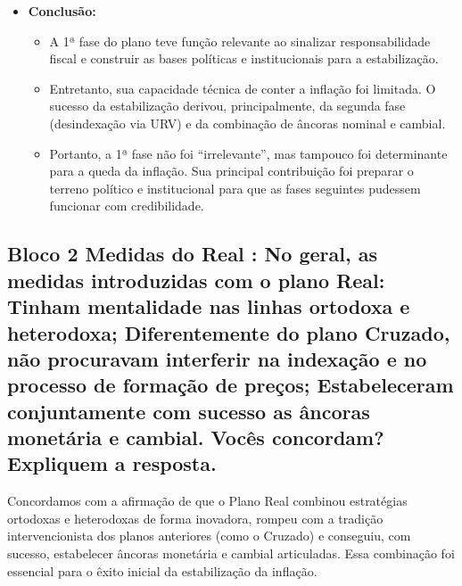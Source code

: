 \documentclass[a4paper,12pt]{article}[abntex2]
\begin{document}
\begin{itemize}
    \item \textbf{Conclusão:}
    \begin{itemize}
        \item A 1ª fase do plano teve função relevante ao sinalizar responsabilidade fiscal e construir as bases políticas e institucionais para a estabilização.
        \item Entretanto, sua capacidade técnica de conter a inflação foi limitada. O sucesso da estabilização derivou, principalmente, da segunda fase (desindexação via URV) e da combinação de âncoras nominal e cambial.
        \item Portanto, a 1ª fase não foi “irrelevante”, mas tampouco foi determinante para a queda da inflação. Sua principal contribuição foi preparar o terreno político e institucional para que as fases seguintes pudessem funcionar com credibilidade.

    \end{itemize}

\end{itemize}

\subsection{\textbf{Bloco 2 Medidas do Real : No geral, as medidas introduzidas com o plano Real: Tinham mentalidade nas linhas ortodoxa e heterodoxa; Diferentemente do plano Cruzado, não procuravam interferir na indexação e no processo de formação de preços; Estabeleceram conjuntamente com sucesso as âncoras monetária e cambial. Vocês concordam? Expliquem a resposta.}}

Concordamos com a afirmação de que o Plano Real combinou estratégias ortodoxas e heterodoxas de forma inovadora, rompeu com a tradição intervencionista dos planos anteriores (como o Cruzado) e conseguiu, com sucesso, estabelecer âncoras monetária e cambial articuladas. Essa combinação foi essencial para o êxito inicial da estabilização da inflação.
\end{document}
